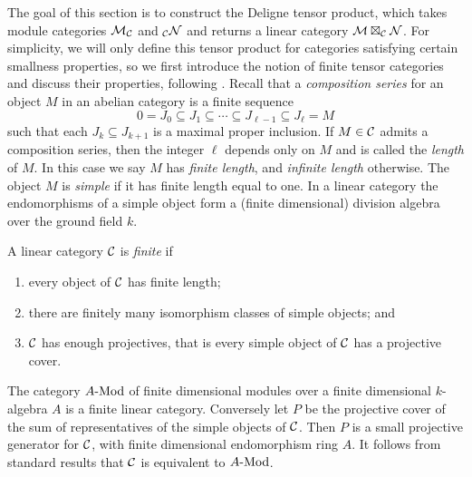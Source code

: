 \documentclass[a4paper]{amsart}
\begin{document}
The goal of this section is to construct the Deligne tensor product, which takes module categories $\mathcal M_\mathcal C$ and ${}_\mathcal C \mathcal N$ and returns a linear category $\mathcal M \boxtimes_\mathcal C \mathcal N$. For simplicity, we will only define this tensor product for categories satisfying certain smallness properties, so we first introduce the notion of finite tensor categories and discuss their properties, following \cite{MR2119143, EGNO}. Recall that a {\em composition series} for an object $M$ in an abelian category is a finite sequence
\begin{equation*}
	0 = J_0 \subseteq J_1 \subseteq \cdots \subseteq J_{\ell-1} \subseteq J_{\ell} = M
\end{equation*} 
such that each $J_k \subseteq J_{k+1}$ is a maximal proper inclusion. If $M \in \mathcal C$ admits a composition series, then the integer $\ell$ depends only on $M$ and is called the {\em length} of $M$. In this case we say $M$ has {\em finite length}, and {\em infinite length} otherwise. The object $M$ is {\em simple} if it has finite length equal to one. In a linear category the endomorphisms of a simple object form a (finite dimensional) division algebra over the ground field $k$. 

\begin{definition} %
	A linear category $\mathcal C$ is {\em finite} if 
	\begin{enumerate}
		\item every object of $\mathcal C$ has finite length; 
		\item there are finitely many isomorphism classes of simple objects; and  
		\item $\mathcal C$ has enough projectives, that is every simple object of $\mathcal C$ has a projective cover.
	\end{enumerate}
\end{definition}

\begin{remark} The category $\Mod{A}{}$ of finite dimensional modules over a finite dimensional $k$-algebra $A$ is a finite linear category. Conversely let $P$ be the projective cover of the sum of representatives of the simple objects of $\mathcal C$. Then $P$ is a small projective generator for $\mathcal C$, with finite dimensional endomorphism ring $A$. It follows from standard results \cite[Ex. 4-F]{MR0166240} that $\mathcal C$ is equivalent to $\Mod{A}{}$.
\end{remark}
\end{document}
